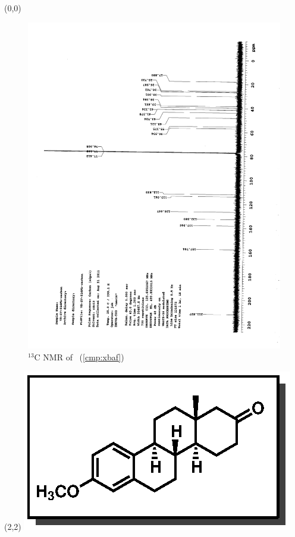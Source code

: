 \clearpage
\begin{textblock}{20}(0,0)
\begin{figure}[htb]
\caption{$^{13}$C NMR of  \CMPxbaf\ (\ref{cmp:xbaf})}
\includegraphics[scale=0.75, trim = 0mm 0mm 0mm 5mm,
clip]{chp_singlecarbon/images/nmr/xbafC}
\vspace{-100pt}
\end{figure}
\end{textblock}
\begin{textblock}{1}(2,2)
\includegraphics[scale=0.8, angle=90]{chp_singlecarbon/images/xbaf}
\end{textblock}
\clearpage

